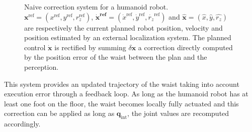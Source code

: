 \begin{figure}[ht!]
  \begin{center}
  \end{center}
  \caption{Naive correction system for a humanoid
    robot. $\mathbf{x}^{\text{ref}} = (x^{\text{ref}}, y^{\text{ref}},
    r_z^{\text{ref}})$, $\mathbf{\dot{x}^{\text{ref}}} =
    (\dot{x}^{\text{ref}}, \dot{y}^{\text{ref}},
    \dot{r_z}^{\text{ref}})$ and $\mathbf{\hat{x}} = (\hat{x},
    \hat{y}, \hat{r_z})$ are respectively the current planned robot
    position, velocity and position estimated by an external
    localization system. The planned control $\mathbf{\dot{x}}$ is
    rectified by summing $\delta \mathbf{x}$ a correction directly
    computed by the position error of the waist between the plan and
    the perception. \label{fig:system}}
\end{figure}
%
%
This system provides an updated trajectory of the waist taking into
account execution error through a feedback loop. As long as the
humanoid robot has at least one foot on the floor, the waist becomes
locally fully actuated and this correction can be applied as long as
$\mathbf{q}_{\text{int}}$, the joint values are recomputed
accordingly.


